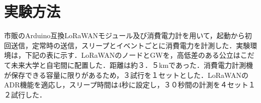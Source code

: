 \section{実験方法}
市販のArduino互換LoRaWANモジュール及び消費電力計を用いて，起動から初回送信，定常時の送信，スリープとイベントごとに消費電力を計測した．実験環境は，下記の表に示す．LoRaWANのノードとGWを，高低差のある公立はこだて未来大学と自宅間に配置した．距離は約３．５kmであった．消費電力計測機が保存できる容量に限りがあるため，３試行を１セットとした．LoRaWANのADR機能を適応し，スリープ時間は4秒に設定し，３０秒間の計測を４セット１２試行した．